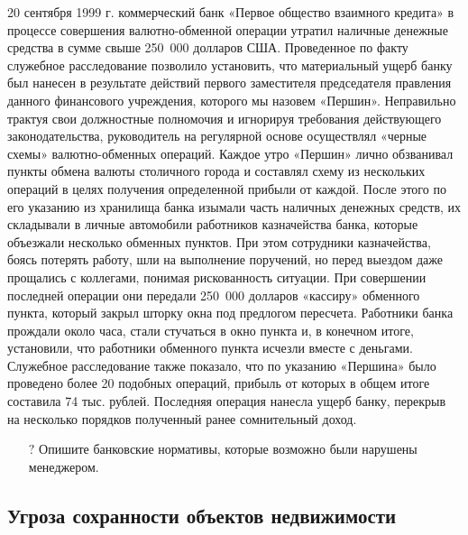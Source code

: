 \documentclass[a4paper,12pt,fleqn]{article} %
\begin{document}
\begin{tcolorbox}[colback=blue!55!red!5!,colframe=blue!55!red,enforce breakable,%
	pad at break=1mm, title=Кейс 31. Изобретательный менеджер]

20 сентября 1999 г. коммерческий банк «Первое общество взаимного кредита» в процессе совершения валютно-обменной операции утратил наличные денежные средства в сумме свыше 250 000 долларов США. Проведенное по факту служебное расследование позволило установить, что материальный ущерб банку был нанесен в результате действий первого заместителя председателя правления данного финансового учреждения, которого мы назовем «Першин». Неправильно трактуя свои должностные полномочия и игнорируя требования действующего законодательства, руководитель на регулярной основе осуществлял «черные схемы» валютно-обменных операций. Каждое утро «Першин» лично обзванивал пункты обмена валюты столичного города и составлял схему из нескольких операций в целях получения определенной прибыли от каждой. После этого по его указанию из хранилища банка изымали часть наличных денежных средств, их складывали в личные автомобили работников казначейства банка, которые объезжали несколько обменных пунктов. При этом сотрудники казначейства, боясь потерять работу, шли на выполнение поручений, но перед выездом даже прощались с коллегами, понимая рискованность ситуации. При совершении последней операции они передали 250 000 долларов «кассиру» обменного пункта, который закрыл шторку окна под предлогом пересчета. Работники банка прождали около часа, стали стучаться в окно пункта и, в конечном итоге, установили, что работники обменного пункта исчезли вместе с деньгами. Служебное расследование также показало, что по указанию «Першина» было проведено более 20 подобных операций, прибыль от которых в общем итоге составила 74 тыс. рублей. Последняя операция нанесла ущерб банку, перекрыв на несколько порядков полученный ранее сомнительный доход.	
	
\begin{itemize}
	\item[{\color{blue!55!red}\Huge {  $ ? $}} \quad]   Опишите банковские нормативы, которые возможно были нарушены менеджером.
\end{itemize}	
	
\end{tcolorbox}	
	
	
\subsection{Угроза сохранности объектов недвижимости}	
	
\end{document}

